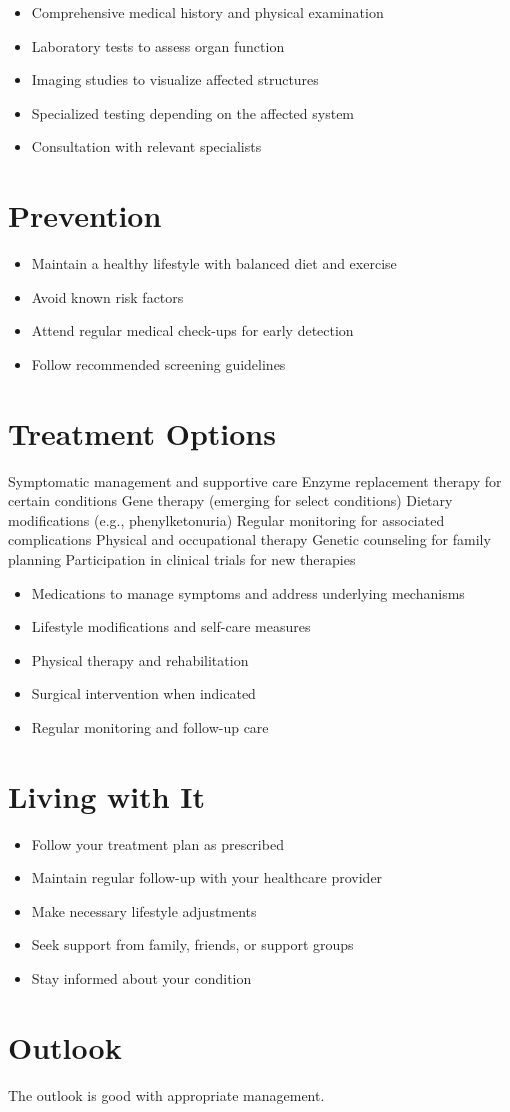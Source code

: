 \begin{itemize}[noitemsep]
  \item Comprehensive medical history and physical examination
  \item Laboratory tests to assess organ function
  \item Imaging studies to visualize affected structures
  \item Specialized testing depending on the affected system
  \item Consultation with relevant specialists
\end{itemize}
\section{Prevention}
\begin{itemize}[noitemsep]
  \item Maintain a healthy lifestyle with balanced diet and exercise
  \item Avoid known risk factors
  \item Attend regular medical check-ups for early detection
  \item Follow recommended screening guidelines
\end{itemize}
\section{Treatment Options}
Symptomatic management and supportive care Enzyme replacement therapy for certain conditions Gene therapy (emerging for select conditions) Dietary modifications (e.g., phenylketonuria) Regular monitoring for associated complications Physical and occupational therapy Genetic counseling for family planning Participation in clinical trials for new therapies

\begin{itemize}[noitemsep]
  \item Medications to manage symptoms and address underlying mechanisms
  \item Lifestyle modifications and self-care measures
  \item Physical therapy and rehabilitation
  \item Surgical intervention when indicated
  \item Regular monitoring and follow-up care
\end{itemize}
\section{Living with It}
\begin{itemize}[noitemsep]
  \item Follow your treatment plan as prescribed
  \item Maintain regular follow-up with your healthcare provider
  \item Make necessary lifestyle adjustments
  \item Seek support from family, friends, or support groups
  \item Stay informed about your condition
\end{itemize}
\section{Outlook}
The outlook is good with appropriate management.
